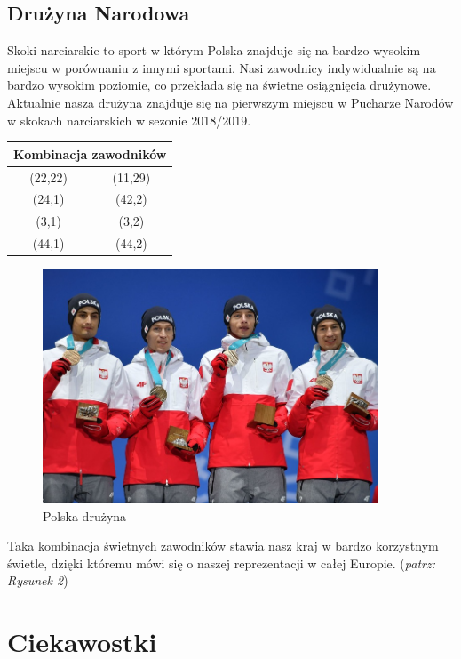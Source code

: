 \documentclass[11pt]{article}
\begin{document}
\subsection{Drużyna Narodowa}
Skoki narciarskie to sport w którym Polska znajduje się na bardzo wysokim miejscu w porównaniu z innymi sportami. Nasi zawodnicy indywidualnie są na bardzo wysokim poziomie, co przekłada się na świetne osiągnięcia drużynowe.
Aktualnie nasza drużyna znajduje się na pierwszym miejscu w Pucharze Narodów w skokach narciarskich w sezonie 2018/2019. 
\newpage 
\begin{center}
\begin{tabular}{||c|c||} \hline
\multicolumn{2}{||c||}{Kombinacja zawodników}
\\ \hline \hline
(22,22) & (11,29) \\
(24,1) & (42,2) \\ \hline
(3,1) & (3,2) \\
(44,1) & (44,2) \\ \hline
\end{tabular}
\end{center}
\begin{figure}
\begin{center}
\caption{Polska drużyna}
\includegraphics[width=100mm,height=!,angle=45]{Druzyna.jpg}
\end{center}
\end{figure}
Taka kombinacja świetnych zawodników stawia nasz kraj w bardzo korzystnym świetle, dzięki któremu mówi się o naszej reprezentacji w całej Europie.
(\textit{\small patrz: Rysunek 2}) \cite{wiki}
\newpage
\section{Ciekawostki}
\end{document}
